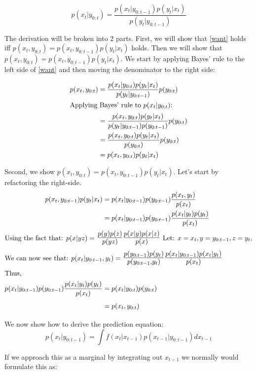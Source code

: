 \documentclass{article}
\begin{document}
\begin{equation} \label{want}
p(x_t|y_{0:t}) = \frac{p(x_t|y_{0:t-1})p(y_t|x_t)}{p(y_t|y_{0:t-1})}
\end{equation}

The derivation will be broken into 2 parts. First, we will show that \eqref{want} holds iff $p(x_t,y_{0:t}) = p(x_t,y_{0:t-1})p(y_t|x_t)$ holds. Then we will show that $p(x_t,y_{0:t}) = p(x_t,y_{0:t-1})p(y_t|x_t)$. We start by applying Bayes' rule to the left side of \eqref{want} and then moving the denominator to the right side:

\begin{align*}
p(x_t,y_{0:t}) &= \frac{p(x_t|y_{0:t})p(y_t|x_t)}{p(y_t|y_{0:t-1})}p(y_{0:t}) \\
\intertext{Applying Bayes' rule to $p(x_t|y_{0:t})$:}
&= \frac{p(x_t,y_{0:t})p(y_t|x_t)}{p(y_t|y_{0:t-1})p(y_{0:t-1})}p(y_{0:t}) \\
&= \frac{p(x_t,y_{0:t})p(y_t|x_t)}{p(y_{0:t})}p(y_{0:t}) \\
&= p(x_t,y_{0:t})p(y_t|x_t)
\end{align*}

\noindent
Second, we show $p(x_t,y_{0:t}) = p(x_t,y_{0:t-1})p(y_t|x_t)$. Let's start by refactoring the right-side.
\begin{align*}
p(x_t,y_{0:t-1})p(y_t|x_t) &= p(x_t|y_{0:t-1})p(y_{0:t-1})\frac{p(x_t,y_t)}{p(x_t)}\\
&= p(x_t|y_{0:t-1})p(y_{0:t-1})\frac{p(x_t|y_t)p(y_t)}{p(x_t)}\\
\intertext{Using the fact that: $p(x|yz) =$ {\Large $\frac{p(y)p(z)}{p(yz)}\frac{p(x|y)p(x|z)}{p(x)}$}
  Let: $x=x_t, y=y_{0:t-1}, z = y_t,$}
\intertext{We can now see that:  $p(x_t|y_{0:t-1},y_t) =$ {\Large $\frac{p(y_{0:t-1})p(y_t)}{p(y_{0:t-1},y_t)}\frac{p(x_t|y_{0:t-1})p(x_t|y_t)}{p(x_t)}$}}
\intertext{Thus,}
p(x_t|y_{0:t-1})p(y_{0:t-1})\frac{p(x_t|y_t)p(y_t)}{p(x_t)} &= p(x_t|y_{0:t})p(y_{0:t})\\
&= p(x_t,y_{0:t})\\
\end{align*}

\noindent
We now show how to derive the prediction equation:
\begin{equation}
p(x_t|y_{0:t-1}) = \int f(x_t|x_{t-1})p(x_{t-1}|y_{0:t-1}) dx_{t-1}
\end{equation}

\noindent
If we approach this as a marginal by integrating out $x_{t-1}$ we normally would formulate this as:
\end{document}
